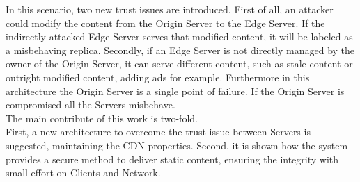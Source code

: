 \documentclass[hidelinks,conference,compsoc]{IEEEtran}
\begin{document}
In this scenario, two new trust issues are introduced. First of all, an attacker could modify the content from the Origin Server to the Edge Server. If the indirectly attacked Edge Server serves that modified content, it will be labeled as a misbehaving replica. Secondly, if an Edge Server is not directly managed by the owner of the Origin Server, it can serve different content, such as stale content or outright modified content, adding ads for example.
Furthermore in this architecture the Origin Server is a single point of failure. If the Origin Server is compromised all the Servers misbehave.\\
The main contribute of this work is two-fold.\\First, a new architecture to overcome the trust issue between Servers is suggested, maintaining the CDN properties. Second, it is shown how the system provides a secure method to deliver static content, ensuring the integrity with small effort on Clients and Network. 
\end{document}

